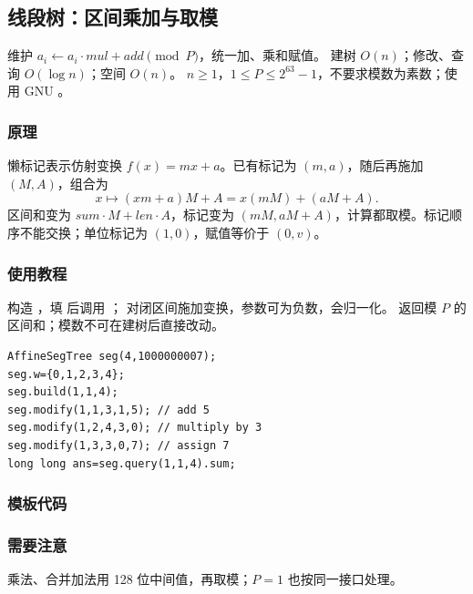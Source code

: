 \subsection{线段树：区间乘加与取模}
\label{ds:seg-affine}
\AlgorithmInfo
    {维护 $a_i\gets a_i\cdot mul+add\pmod P$，统一加、乘和赋值。}
    {建树 $O(n)$；修改、查询 $O(\log n)$；空间 $O(n)$。}
    {$n\ge1$，$1\le P\le2^{63}-1$，不要求模数为素数；使用 GNU 。}
\subsubsection*{原理}
懒标记表示仿射变换 $f(x)=mx+a$。已有标记为 $(m,a)$，随后再施加 $(M,A)$，组合为
\[
 x\longmapsto (xm+a)M+A=x(mM)+(aM+A).
\]
区间和变为 $sum\cdot M+len\cdot A$，标记变为 $(mM,aM+A)$，计算都取模。标记顺序不能交换；单位标记为 $(1,0)$，赋值等价于 $(0,v)$。

\subsubsection*{使用教程}
构造 ，填  后调用 ； 对闭区间施加变换，参数可为负数，会归一化。 返回模 $P$ 的区间和；模数不可在建树后直接改动。
\begin{lstlisting}[style=mtycpp,numbers=none]
AffineSegTree seg(4,1000000007);
seg.w={0,1,2,3,4};
seg.build(1,1,4);
seg.modify(1,1,3,1,5); // add 5
seg.modify(1,2,4,3,0); // multiply by 3
seg.modify(1,3,3,0,7); // assign 7
long long ans=seg.query(1,1,4).sum;
\end{lstlisting}
\subsubsection*{模板代码}
\subsubsection*{需要注意}
乘法、合并加法用 128 位中间值，再取模；$P=1$ 也按同一接口处理。
